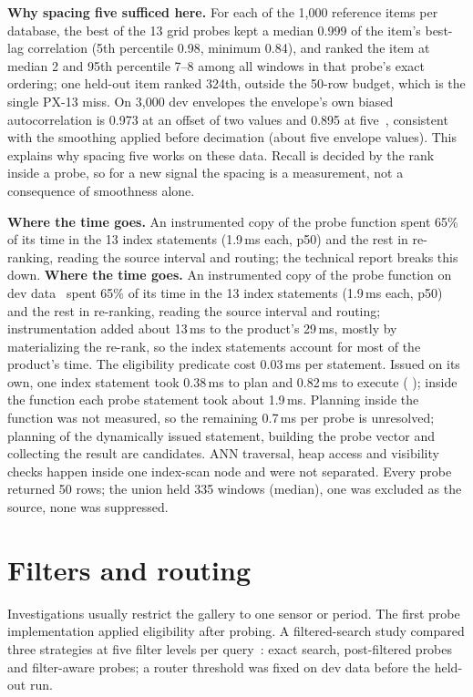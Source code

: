 \documentclass[sigconf]{acmart}
\begin{document}
\textbf{Why spacing five sufficed here.} For each of the 1,000 reference items per database, the best of the 13 grid probes kept a median 0.999 of the item's best-lag correlation (5th percentile 0.98, minimum 0.84), and ranked the item at median 2 and 95th percentile 7--8 among all windows in that probe's exact ordering; one held-out item ranked 324th, outside the 50-row budget, which is the single PX-13 miss. On 3,000 dev envelopes the envelope's own biased autocorrelation is 0.973 at an offset of two values and 0.895 at five~\cite{grid}, consistent with the smoothing applied before decimation (about five envelope values). This explains why spacing five works on these data. Recall is decided by the rank inside a probe, so for a new signal the spacing is a measurement, not a consequence of smoothness alone.

\ifdefined\SigmodSubmission \textbf{Where the time goes.} An instrumented copy of the probe function spent 65\% of its time in the 13 index statements (1.9\,ms each, p50) and the rest in re-ranking, reading the source interval and routing; the technical report breaks this down.\else
\textbf{Where the time goes.} An instrumented copy of the probe function on dev data~\cite{e1} spent 65\% of its time in the 13 index statements (1.9\,ms each, p50) and the rest in re-ranking, reading the source interval and routing; instrumentation added about 13\,ms to the product's 29\,ms, mostly by materializing the re-rank, so the index statements account for most of the product's time. The eligibility predicate cost 0.03\,ms per statement. Issued on its own, one index statement took 0.38\,ms to plan and 0.82\,ms to execute ( ); inside the function each probe statement took about 1.9\,ms. Planning inside the function was not measured, so the remaining 0.7\,ms per probe is unresolved; planning of the dynamically issued statement, building the probe vector and collecting the result are candidates. ANN traversal, heap access and visibility checks happen inside one index-scan node and were not separated. Every probe returned 50 rows; the union held 335 windows (median), one was excluded as the source, none was suppressed.
\fi

\section{Filters and routing}\label{sec:filters}
Investigations usually restrict the gallery to one sensor or period. The first probe implementation applied eligibility after probing. A filtered-search study compared three strategies at five filter levels per query~\cite{ss3}: exact search, post-filtered probes and filter-aware probes; a router threshold was fixed on dev data before the held-out run.
\end{document}
